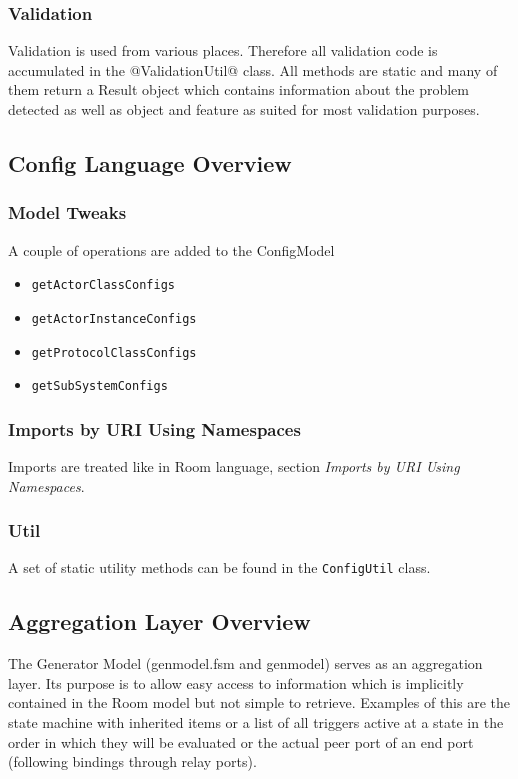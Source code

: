 \subsubsection*{Validation}

Validation is used from various places. Therefore all validation code is accumulated in the 
@ValidationUtil@ class. All methods are static and many of them return a Result object which contains 
information about the problem detected as well as object and feature as suited for most validation purposes.

\subsection{Config Language Overview}

\subsubsection*{Model Tweaks}

A couple of operations are added to the ConfigModel
\begin{itemize}
\item \texttt{getActorClassConfigs}
\item \texttt{getActorInstanceConfigs}
\item \texttt{getProtocolClassConfigs}
\item \texttt{getSubSystemConfigs}
\end{itemize}

\subsubsection*{Imports by URI Using Namespaces}

Imports are treated like in Room language, section \textit{Imports by URI Using Namespaces}.

\subsubsection*{Util}

A set of static utility methods can be found in the \texttt{ConfigUtil} class.

\subsection{Aggregation Layer Overview}

The \eTrice{} Generator Model (genmodel.fsm and genmodel) serves as an aggregation layer. Its purpose is to allow easy access 
to information which is implicitly contained in the Room model but not simple to retrieve.
Examples of this are the state machine with inherited items or a list of all triggers active at a state in 
the order in which they will be evaluated or the actual peer port of an end port (following bindings 
through relay ports).

